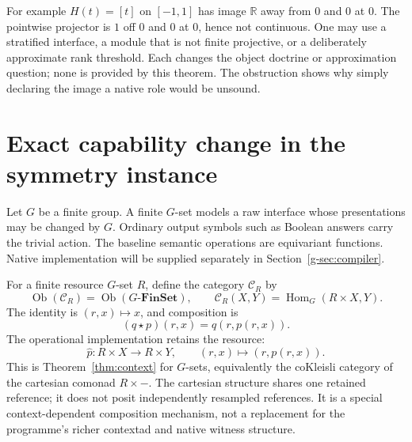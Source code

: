 \documentclass[11pt]{article}
\theoremstyle{definition}
\theoremstyle{remark}
\newcommand{\R}{\mathbb R}
\newcommand{\FinSet}{\mathbf{FinSet}}
\newcommand{\Hom}{\operatorname{Hom}}
\newcommand{\C}{\mathcal C}
\begin{document}
For example $H(t)=[t]$ on $[-1,1]$ has image $\R$ away from $0$ and $0$ at $0$. The pointwise projector is $1$ off $0$ and $0$ at $0$, hence not continuous. One may use a stratified interface, a module that is not finite projective, or a deliberately approximate rank threshold. Each changes the object doctrine or approximation question; none is provided by this theorem. The obstruction shows why simply declaring the image a native role would be unsound.


\section{Exact capability change in the symmetry instance}\label{sec:symmetry}
Let $G$ be a finite group. A finite $G$-set models a raw interface whose presentations may be changed by $G$. Ordinary output symbols such as Boolean answers carry the trivial action. The baseline semantic operations are equivariant functions. Native implementation will be supplied separately in Section~\ref{g-sec:compiler}.

For a finite resource $G$-set $R$, define the category $\C_R$ by
\[
 \operatorname{Ob}(\C_R)=\operatorname{Ob}(G\text{-}\FinSet),\qquad
 \C_R(X,Y)=\Hom_G(R\times X,Y).
\]
The identity is $(r,x)\mapsto x$, and composition is
\[
 (q\mathbin{\star}p)(r,x)=q(r,p(r,x)).
\]
The operational implementation retains the resource:
\[
 \widehat p:R\times X\longrightarrow R\times Y,
 \qquad (r,x)\longmapsto(r,p(r,x)).
\]
This is Theorem~\ref{thm:context} for $G$-sets, equivalently the coKleisli category of the cartesian comonad $R\times-$. The cartesian structure shares one retained reference; it does not posit independently resampled references. It is a special context-dependent composition mechanism, not a replacement for the programme's richer contextad and native witness structure.
\end{document}

